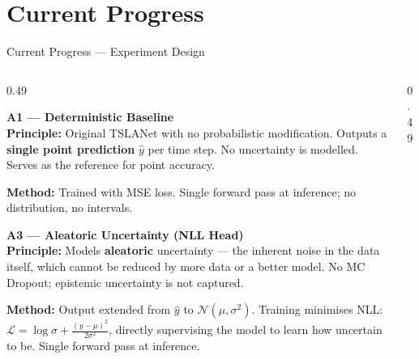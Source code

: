 \documentclass[10pt]{beamer}
\begin{document}

\section{Current Progress}


\begin{frame}[shrink=8]{Current Progress — Experiment Design}
\begin{columns}[t]

  \begin{column}{0.49\textwidth}

    \begin{block}{\footnotesize\textbf{A1 — Deterministic Baseline}}
      \scriptsize
      ~\\
      \textbf{Principle:} Original TSLANet with no probabilistic modification.
      Outputs a \textbf{single point prediction} $\hat{y}$ per time step.
      No uncertainty is modelled. Serves as the reference for point accuracy.
      \par\vspace{4pt}
      \textbf{Method:} Trained with MSE loss. Single forward pass at inference;
      no distribution, no intervals.
    \end{block}

    \vspace{0.4em}

    \begin{block}{\footnotesize\textbf{A3 — Aleatoric Uncertainty (NLL Head)}}
      \scriptsize
      ~\\
      \textbf{Principle:} Models \textbf{aleatoric} uncertainty --- the
      inherent noise in the data itself, which cannot be reduced by more
      data or a better model. No MC Dropout; epistemic uncertainty is
      not captured.
      \par\vspace{4pt}
      \textbf{Method:} Output extended from $\hat{y}$ to $\mathcal{N}(\mu,\sigma^2)$.
      Training minimises NLL: $\mathcal{L} = \log\sigma + \frac{(y-\mu)^2}{2\sigma^2}$,
      directly supervising the model to learn how uncertain to be.
      Single forward pass at inference.
    \end{block}

  \end{column}

  \begin{column}{0.49\textwidth}


\end{column}
\end{columns}
\end{frame}
\end{document}
